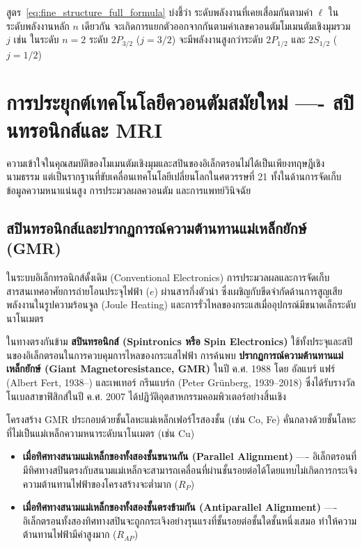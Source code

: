 สูตร~\eqref{eq:fine_structure_full_formula} บ่งชี้ว่า ระดับพลังงานที่เคยเสื่อมกันตามค่า $\ell$ ในระดับพลังงานหลัก $n$ เดียวกัน จะเกิดการแยกตัวออกจากกันตามค่าเลขควอนตัมโมเมนตัมเชิงมุมรวม $j$ เช่น ในระดับ $n = 2$ ระดับ $2P_{3/2}$ ($j = 3/2$) จะมีพลังงานสูงกว่าระดับ $2P_{1/2}$ และ $2S_{1/2}$ ($j = 1/2$)

\section{การประยุกต์เทคโนโลยีควอนตัมสมัยใหม่ ---- สปินทรอนิกส์และ MRI}

ความเข้าใจในคุณสมบัติของโมเมนตัมเชิงมุมและสปินของอิเล็กตรอนไม่ได้เป็นเพียงทฤษฎีเชิงนามธรรม แต่เป็นรากฐานที่ขับเคลื่อนเทคโนโลยีเปลี่ยนโลกในศตวรรษที่ 21 ทั้งในด้านการจัดเก็บข้อมูลความหนาแน่นสูง การประมวลผลควอนตัม และการแพทย์วินิจฉัย

\subsection{สปินทรอนิกส์และปรากฏการณ์ความต้านทานแม่เหล็กยักษ์ (GMR)}
ในระบบอิเล็กทรอนิกส์ดั้งเดิม (Conventional Electronics) การประมวลผลและการจัดเก็บสารสนเทศอาศัยการถ่ายโอนประจุไฟฟ้า ($e$) ผ่านสารกึ่งตัวนำ ซึ่งเผชิญกับขีดจำกัดด้านการสูญเสียพลังงานในรูปความร้อนจูล (Joule Heating) และการรั่วไหลของกระแสเมื่ออุปกรณ์มีขนาดเล็กระดับนาโนเมตร

ในทางตรงกันข้าม \textbf{สปินทรอนิกส์ (Spintronics หรือ Spin Electronics)} ใช้ทั้งประจุและสปินของอิเล็กตรอนในการควบคุมการไหลของกระแสไฟฟ้า การค้นพบ \textbf{ปรากฏการณ์ความต้านทานแม่เหล็กยักษ์ (Giant Magnetoresistance, GMR)} ในปี ค.ศ. 1988 โดย อัลแบร์ แฟร์ (Albert Fert, 1938--) และเพเทอร์ กรึนแบร์ก (Peter Grünberg, 1939--2018) ซึ่งได้รับรางวัลโนเบลสาขาฟิสิกส์ในปี ค.ศ. 2007 ได้ปฏิวัติอุตสาหกรรมคอมพิวเตอร์อย่างสิ้นเชิง

โครงสร้าง GMR ประกอบด้วยชั้นโลหะแม่เหล็กเฟอร์โรสองชั้น (เช่น Co, Fe) คั่นกลางด้วยชั้นโลหะที่ไม่เป็นแม่เหล็กความหนาระดับนาโนเมตร (เช่น Cu)
\begin{itemize}
    \item \textbf{เมื่อทิศทางสนามแม่เหล็กของทั้งสองชั้นขนานกัน (Parallel Alignment)} ---- อิเล็กตรอนที่มีทิศทางสปินตรงกับสนามแม่เหล็กจะสามารถเคลื่อนที่ผ่านชั้นรอยต่อได้โดยแทบไม่เกิดการกระเจิง ความต้านทานไฟฟ้าของโครงสร้างจะต่ำมาก ($R_P$)
    \item \textbf{เมื่อทิศทางสนามแม่เหล็กของทั้งสองชั้นตรงข้ามกัน (Antiparallel Alignment)} ---- อิเล็กตรอนทั้งสองทิศทางสปินจะถูกกระเจิงอย่างรุนแรงที่ชั้นรอยต่อชั้นใดชั้นหนึ่งเสมอ ทำให้ความต้านทานไฟฟ้ามีค่าสูงมาก ($R_{AP}$)
\end{itemize}

